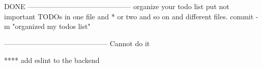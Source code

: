 

DONE
--------------------------------------------
organize your todo list put not important TODOs in one file and * or two and so on and different files.
    commit -m "organized my todos list"



--------------------------------------------
Cannot do it

**** add eslint to the backend
